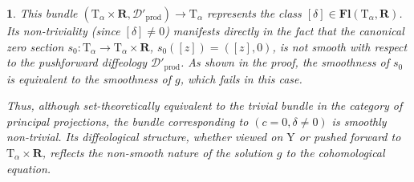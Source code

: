 \documentclass[10pt,letterpaper,reqno]{amsart}
\theoremstyle{article}
\newtheorem{article}[subsection]{}
\newcommand{\1}{{\hat 1}}
\newcommand{\0}{{\hat 0}}
\newcommand{\RR}{\mathbf R}
\newcommand{\cD}{{\mathcal D}}
\def \T{\mathrm T}
\def \Y{\mathrm Y}
\newcommand{\cl}[1]{\left[ #1 \right]}
\DeclareMathOperator{\Fb}{\boldsymbol{\mathsf{Fl}}}
\newcommand{\product}{\mathrm{prod}}
\renewcommand{\Fb}{\mathbf{Fl}}
\begin{document}
\begin{article}
    This bundle $(\T_\alpha \times \RR, \cD'_{\product}) \to \T_\alpha$ represents the class $\cl{\delta} \in \Fb(\T_\alpha, \RR)$.
    Its non-triviality (since $\cl{\delta} \ne 0$) manifests directly in the fact that the canonical zero section $s_0: \T_\alpha \to \T_\alpha \times \RR$,
    $s_0(\cl{z}) = (\cl{z}, 0)$,
    is \emph{not smooth} with respect to the pushforward diffeology $\cD'_{\product}$.
    As shown in the proof,
    the smoothness of $s_0$ is equivalent to the smoothness of $g$,
    which fails in this case.
    
    Thus,
    although set-theoretically equivalent to the trivial bundle in the category of principal projections,
    the bundle corresponding to $(c=0, \delta \ne 0)$ is smoothly non-trivial.
    Its diffeological structure,
    whether viewed on $\Y$ or pushed forward to $\T_\alpha \times \RR$,
    reflects the non-smooth nature of the solution $g$ to the cohomological equation.
    
  \end{article}
  
\end{document}
